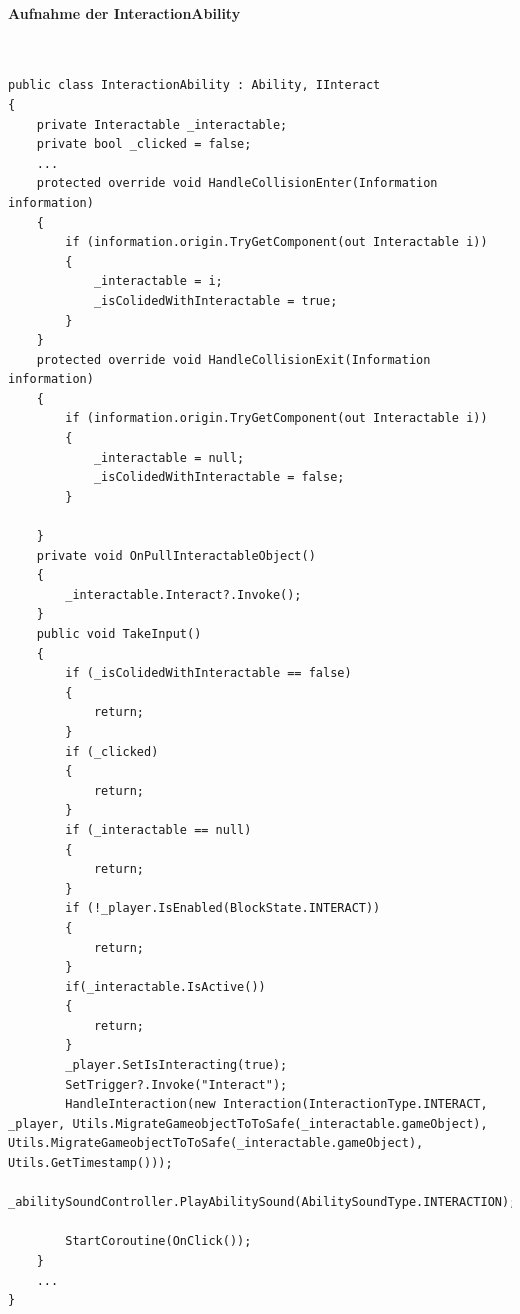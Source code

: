 \paragraph{Aufnahme der InteractionAbility}
~
\begin{lstlisting}[caption={Ausschnitt aus InteractionAbility.cs}, label={lst:interaction-ability}]
public class InteractionAbility : Ability, IInteract
{
    private Interactable _interactable;
    private bool _clicked = false;
    ...
    protected override void HandleCollisionEnter(Information information)
    {
        if (information.origin.TryGetComponent(out Interactable i))
        {
            _interactable = i;
            _isColidedWithInteractable = true;
        }
    }
    protected override void HandleCollisionExit(Information information)
    {
        if (information.origin.TryGetComponent(out Interactable i))
        {
            _interactable = null;
            _isColidedWithInteractable = false;
        }

    }
    private void OnPullInteractableObject()
    {
        _interactable.Interact?.Invoke();
    }
    public void TakeInput()
    {
        if (_isColidedWithInteractable == false)
        {
            return;
        }
        if (_clicked)
        {
            return;
        }
        if (_interactable == null)
        {
            return;
        }
        if (!_player.IsEnabled(BlockState.INTERACT))
        {
            return;
        }
        if(_interactable.IsActive())
        {
            return;
        }
        _player.SetIsInteracting(true);
        SetTrigger?.Invoke("Interact");
        HandleInteraction(new Interaction(InteractionType.INTERACT, _player, Utils.MigrateGameobjectToToSafe(_interactable.gameObject), Utils.MigrateGameobjectToToSafe(_interactable.gameObject), Utils.GetTimestamp()));
        _abilitySoundController.PlayAbilitySound(AbilitySoundType.INTERACTION);

        StartCoroutine(OnClick());
    }
    ...
}
\end{lstlisting}

